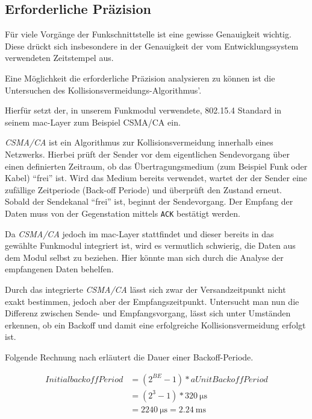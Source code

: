 \subsection{Erforderliche Präzision}\label{subs:praezision}
Für viele Vorgänge der Funkschnittstelle ist eine gewisse Genauigkeit wichtig.
Diese drückt sich insbesondere in der Genauigkeit der vom Entwicklungssystem
verwendeten Zeitstempel aus.

Eine Möglichkeit die erforderliche Präzision analysieren zu können ist die
Untersuchen des Kollisionsvermeidungs-Algorithmus'.

Hierfür setzt der, in unserem Funkmodul verwendete, 802.15.4 Standard in seinem
\gls{mac}-Layer zum Beispiel CSMA/CA ein\cite{IEEE01}.
\begin{definition}[CSMA/CA]
\emph{CSMA/CA} ist ein Algorithmus zur Kollisionsvermeidung innerhalb eines
Netzwerks. Hierbei prüft der Sender vor dem eigentlichen Sendevorgang über
einen definierten Zeitraum, ob das Übertragungsmedium (zum Beispiel Funk oder
Kabel) "`frei"' ist. Wird das Medium bereits verwendet, wartet der der Sender
eine zufällige Zeitperiode (Back-off Periode) und überprüft den Zustand erneut.
Sobald der Sendekanal "`frei"' ist, beginnt der Sendevorgang. Der Empfang der Daten muss
von der Gegenstation mittels \texttt{ACK} bestätigt werden.
\end{definition}
Da \emph{CSMA/CA} jedoch im \gls{mac}-Layer stattfindet und dieser bereits
in das gewählte Funkmodul integriert ist, wird es vermutlich schwierig,
die Daten aus dem Modul selbst zu beziehen. Hier könnte man sich durch
die Analyse der empfangenen Daten behelfen.

Durch das integrierte \emph{CSMA/CA} lässt sich zwar der Versandzeitpunkt nicht
exakt bestimmen, jedoch aber der Empfangszeitpunkt. Untersucht man nun die
Differenz zwischen Sende- und Empfangsvorgang, lässt sich unter Umständen
erkennen, ob ein Backoff und damit eine erfolgreiche Kollisionsvermeidung
erfolgt ist.

Folgende Rechnung nach\cite{JENN} erläutert die Dauer einer Backoff-Periode.

\begin{align}\label{calc:init}
\mathit{InitialbackoffPeriod} &=(2^{BE}-1)*\mathit{aUnitBackoffPeriod} \\
&=(2^3-1)*\SI{320}{\micro\second}\nonumber \\
&= \SI{2240}{\micro\second} = \SI{2,24}{\milli\second} \nonumber 
\end{align}

